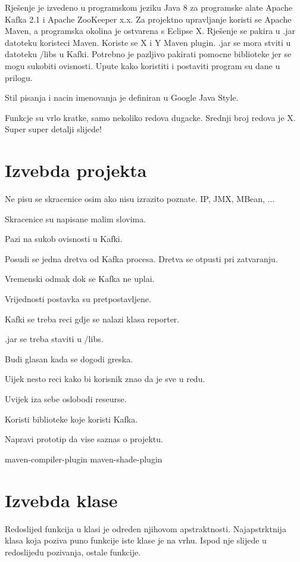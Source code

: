 \documentclass[times, utf8, diplomski, numeric]{fer}
\begin{document}
Rješenje je izvedeno u programskom jeziku Java 8 za programske alate Apache Kafka 2.1 i Apache ZooKeeper x.x. Za projektno upravljanje koristi se Apache Maven, a programska okolina je ostvarena s Eclipse X. Rješenje se pakira u .jar datoteku koristeci Maven. Koriste se X i Y Maven plugin.  .jar se mora stviti u datoteku /libs u Kafki. Potrebno je pazljivo pakirati pomocne biblioteke jer se mogu sukobiti ovisnosti. Upute kako koristiti i postaviti program su dane u prilogu.

Stil pisanja i nacin imenovanja je definiran u Google Java Style. 

Funkcje su vrlo kratke, samo nekoliko redova dugacke. Srednji broj redova je X. Super super detalji slijede!

\section{Izvebda projekta}

Ne pisu se skracenice osim ako nisu izrazito poznate. IP, JMX, MBean, ...

Skracenice su napisane malim slovima.



Pazi na sukob ovisnosti u Kafki.





Posudi se jedna dretva od Kafka procesa. Dretva se otpusti pri zatvaranju.

Vremenski odmak dok se Kafka ne uplai.

Vrijednosti postavka su pretpostavljene.

Kafki se treba reci gdje se nalazi klasa reporter.

.jar se treba staviti u /libs.

Budi glasan kada se dogodi greska.

Uijek nesto reci kako bi korisnik znao da je sve u redu.

Uvijek iza sebe oslobodi reseurse.

Koristi biblioteke koje koristi Kafka.

Napravi prototip da vise saznas o projektu.

maven-compiler-plugin
maven-shade-plugin

\section{Izvebda klase}

Redoslijed funkcija u klasi je odreden njihovom apstraktnosti. Najapstrktnija klasa koja poziva puno funkcije iste klase je na vrhu. Ispod nje slijede u redoslijedu pozivanja, ostale funkcije.
\end{document}
